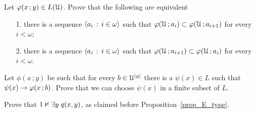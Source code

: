 \documentclass[creche.tex]{subfiles}
\begin{document}
\begin{exercise} 
Let $\varphi(x\,;y)\in L(\EuScript U)$. Prove that the following are equivalent
\begin{itemize}
\item[1.] there is a sequence $\langle a_i\,:\,i\in\omega\rangle$ such that $\varphi(\EuScript U\,;a_i)\subset\varphi(\EuScript U\,;a_{i+1})$ for every $i<\omega$;
\item[2.] there is a sequence $\langle a_i\,:\,i\in\omega\rangle$ such that $\varphi(\EuScript U\,;a_{i+1})\subset\varphi(\EuScript U\,;a_i)$ for every $i<\omega$.\QED  
\end{itemize}
\end{exercise}

\begin{exercise} 
Let $\phi(x\,;y)$ be such that for every $b\in\EuScript U^{|y|}$ there is a $\psi(x)\in L$ such that $\psi(x)\rightarrow\varphi(x\,;b)$. Prove that we can choose $\psi(x)$ in a finite subset of $L$.\QED
\end{exercise}


\begin{exercise}\label{ex_E_type}
Prove that $1\nvDash\exists y\;q(x,y)$, as claimed before Proposition~\ref{prop_E_type}.\QED
\end{exercise}
\end{document}
